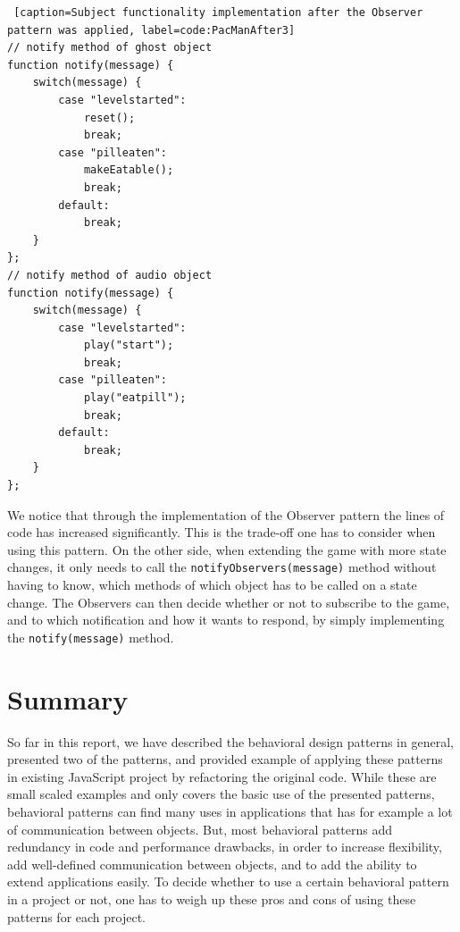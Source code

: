 \documentclass{bioinfo}
\begin{document}
\begin{lstlisting} [caption=Subject functionality implementation after the Observer pattern was applied, label=code:PacManAfter3]
// notify method of ghost object
function notify(message) {
    switch(message) {
        case "levelstarted":
            reset();
            break;
        case "pilleaten":
            makeEatable();
            break;
        default:
            break;
    }
};
// notify method of audio object
function notify(message) {
    switch(message) {
        case "levelstarted":
            play("start");
            break;
        case "pilleaten":
            play("eatpill");
            break;
        default:
            break;
    }
};
\end{lstlisting}

We notice that through the implementation of the Observer pattern the lines of code has increased significantly. This is the trade-off one has to consider when using this pattern. On the other side, when extending the game with more state changes, it only needs to call the \texttt{notifyObservers(message)} method without having to know, which methods of which object has to be called on a state change. The Observers can then decide whether or not to subscribe to the game, and to which notification and how it wants to respond, by simply implementing the \texttt{notify(message)} method.

\section{Summary}
So far in this report, we have described the behavioral design patterns in general, presented two of the patterns, and provided example of applying these patterns in existing JavaScript project by refactoring the original code. While these are small scaled examples and only covers the basic use of the presented patterns, behavioral patterns can find many uses in applications that has for example a lot of communication between objects. But, most behavioral patterns add redundancy in code and performance drawbacks, in order to increase flexibility, add well-defined communication between objects, and to add the ability to extend applications easily. To decide whether to use a certain behavioral pattern in a project or not, one has to weigh up these pros and cons of using these patterns for each project.


%
%
%
%
%
%

%

\end{document}
